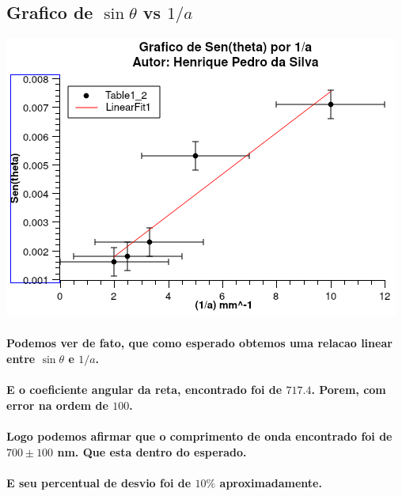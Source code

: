 \documentclass[12pt,twoside, a4paper, twocolumn]{article}
\begin{document}
\subsection{Grafico de $\sin{\theta}$ vs $1/a$}

\begin{adjustbox}{scale=0.70}
  \includegraphics{Graph1.png}
\end{adjustbox}

\paragraph*{Podemos ver de fato, que como esperado obtemos uma relacao linear entre $\sin{\theta}$ e $1/a$.}

\paragraph*{E o coeficiente angular da reta, encontrado foi de $717.4$. Porem, com error na ordem de $100$.}

\paragraph*{Logo podemos afirmar que o comprimento de onda encontrado foi de $700 \pm 100$ nm. Que esta dentro do esperado.}

\paragraph*{E seu percentual de desvio foi de $10\%$ aproximadamente.}

\newpage
\end{document}
